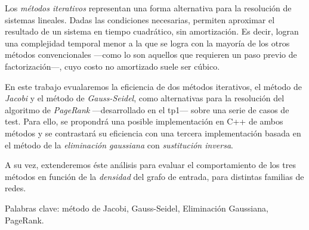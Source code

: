 Los \textit{métodos iterativos} representan una forma alternativa para la resolución de sistemas lineales. Dadas las condiciones necesarias, permiten aproximar el resultado de un sistema en tiempo cuadrático, sin amortización. Es decir, logran una complejidad temporal menor a la que se logra con la mayoría de los otros métodos convencionales ---como lo son aquellos que requieren un paso previo de factorización---, cuyo costo no amortizado suele ser cúbico.

\vspace{1em}
En este trabajo evualaremos la eficiencia de dos métodos iterativos, el método de \textit{Jacobi} y el método de \textit{Gauss-Seidel}, como alternativas para la resolución del algoritmo de \textit{PageRank} ---desarrollado en el tp1--- sobre una serie de casos de test. Para ello, se propondrá una posible implementación en C++ de ambos métodos y se contrastará su eficiencia con una tercera implementación basada en el método de la \textit{eliminación gaussiana} con \textit{sustitución inversa}.

A su vez, extenderemos éste análisis para evaluar el comportamiento de los tres métodos en función de la \textit{densidad} del grafo de entrada, para distintas familias de redes. 

\vspace{1em}
\noindent Palabras clave: método de Jacobi, Gauss-Seidel, Eliminación Gaussiana, PageRank.
